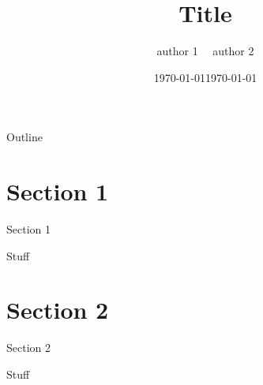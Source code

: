 \documentclass{beamer}
\title[Title]{Title}
\author[authors]{{author 1 \ \ author 2}}
\institute[NBER] 
{\large{\color{black}{Journal (year)}}\\  \small{\emph{presented by Na,e}}}
\date{\today}
\date{\today}
\begin{document}
	
	\begin{frame}
	\titlepage
\end{frame}

\begin{frame}{Outline}
\tableofcontents
\end{frame}

\section{Section 1}	
\begin{frame}{Section 1}

Stuff

\end{frame}	

\section{Section 2}	
\begin{frame}{Section 2}

Stuff

\end{frame}	
\end{document}
